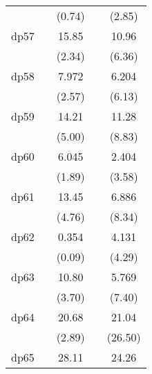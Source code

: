 {\begin{tabular}{l*{4}{c}}
            &                     &      (0.74)         &                     &      (2.85)         \\
[1em]
dp57        &                     &       15.85\sym{*}  &                     &       10.96\sym{***}\\
            &                     &      (2.34)         &                     &      (6.36)         \\
[1em]
dp58        &                     &       7.972\sym{*}  &                     &       6.204\sym{***}\\
            &                     &      (2.57)         &                     &      (6.13)         \\
[1em]
dp59        &                     &       14.21\sym{***}&                     &       11.28\sym{***}\\
            &                     &      (5.00)         &                     &      (8.83)         \\
[1em]
dp60        &                     &       6.045         &                     &       2.404\sym{***}\\
            &                     &      (1.89)         &                     &      (3.58)         \\
[1em]
dp61        &                     &       13.45\sym{***}&                     &       6.886\sym{***}\\
            &                     &      (4.76)         &                     &      (8.34)         \\
[1em]
dp62        &                     &       0.354         &                     &       4.131\sym{***}\\
            &                     &      (0.09)         &                     &      (4.29)         \\
[1em]
dp63        &                     &       10.80\sym{***}&                     &       5.769\sym{***}\\
            &                     &      (3.70)         &                     &      (7.40)         \\
[1em]
dp64        &                     &       20.68\sym{**} &                     &       21.04\sym{***}\\
            &                     &      (2.89)         &                     &     (26.50)         \\
[1em]
dp65        &                     &       28.11\sym{***}&                     &       24.26\sym{***}\\

\end{tabular}}
